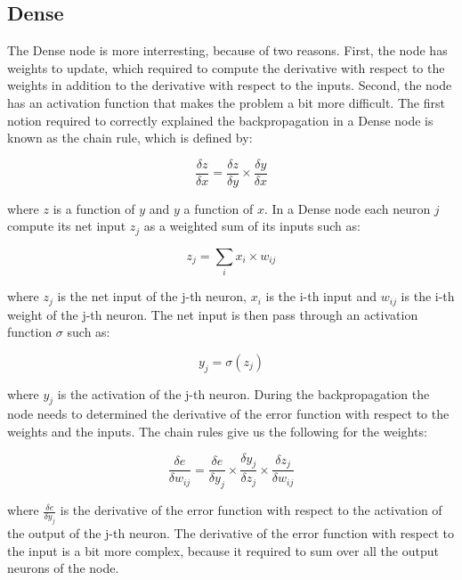 \documentclass[11pt]{report}
\begin{document}
\subsection{Dense}

The Dense node is more interresting, because of two reasons. First, the node has weights to update, which required to compute the derivative with respect to the weights in addition to the derivative with respect to the inputs. Second, the node has an activation function that makes the problem a bit more difficult. The first notion required to correctly explained the backpropagation in a Dense node is known as the chain rule, which is defined by:

\begin{equation}
\frac{\delta z}{\delta x} = \frac{\delta z}{\delta y} \times \frac{\delta y}{\delta x}
\end{equation}

\noindent where $z$ is a function of $y$ and $y$ a function of $x$. In a Dense node each neuron $j$ compute its net input $z_j$ as a weighted sum of its inputs such as:

\begin{equation}
z_j = \sum_{i}{x_i \times w_{ij}}
\end{equation}

\noindent where $z_j$ is the net input of the j-th neuron, $x_i$ is the i-th input and $w_{ij}$ is the i-th weight of the j-th neuron. The net input is then pass through an activation function $\sigma$ such as:

\begin{equation}
y_j = \sigma(z_j)
\end{equation}

\noindent where $y_j$ is the activation of the j-th neuron. During the backpropagation the node needs to determined the derivative of the error function with respect to the weights and the inputs. The chain rules give us the following for the weights:

\begin{equation}
\frac{\delta e}{\delta w_{ij}} = \frac{\delta e}{\delta y_j} \times \frac{\delta y_j}{\delta z_j} \times \frac{\delta z_j}{\delta w_{ij}}
\end{equation}

\noindent where $\frac{\delta e}{\delta y_j}$ is the derivative of the error function with respect to the activation of the output of the j-th neuron. The derivative of the error function with respect to the input is a bit more complex, because it required to sum over all the output neurons of the node.
\end{document}
